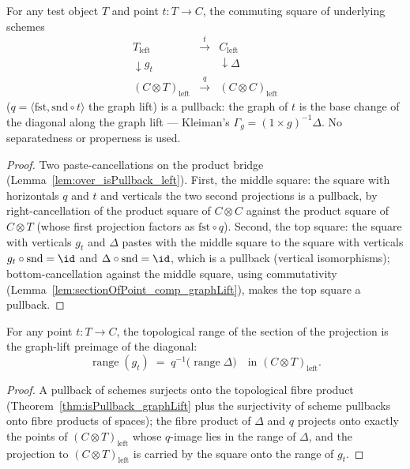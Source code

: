 \begin{theorem}
  \label{thm:isPullback_graphLift}
  \leanok
  For any test object \(T\) and point \(t \colon T \to C\), the commuting square of
  underlying schemes
  \[
    \begin{array}{ccc}
      T_{\mathrm{left}} & \xrightarrow{\ t\ } & C_{\mathrm{left}} \\
      \downarrow g_t & & \downarrow \Delta \\
      (C \otimes T)_{\mathrm{left}} & \xrightarrow{\ q\ } & (C \otimes C)_{\mathrm{left}}
    \end{array}
  \]
  (\(q = \langle\mathrm{fst}, \mathrm{snd} \circ t\rangle\) the graph lift) is a pullback:
  the graph of \(t\) is the base change of the diagonal along the graph lift — Kleiman's
  \(\Gamma_g = (1 \times g)^{-1}\Delta\). No separatedness or properness is used.
\end{theorem}
\begin{proof}
  \leanok
  Two paste-cancellations on the product bridge (Lemma~\ref{lem:over_isPullback_left}).
  First, the middle square: the square with horizontals \(q\) and \(t\) and verticals the
  two second projections is a pullback, by right-cancellation of the product square of
  \(C \otimes C\) against the product square of \(C \otimes T\) (whose first projection
  factors as \(\mathrm{fst} \circ q\)). Second, the top square: the square with verticals
  \(g_t\) and \(\Delta\) pastes with the middle square to the square with verticals
  \(g_t \circ \mathrm{snd} = \id\) and \(\Delta \circ \mathrm{snd} = \id\), which is a
  pullback (vertical isomorphisms); bottom-cancellation against the middle square, using
  commutativity (Lemma~\ref{lem:sectionOfPoint_comp_graphLift}), makes the top square a
  pullback.
\end{proof}

\begin{theorem}
  \label{thm:range_sectionOfPoint_left}
  \leanok
  For any point \(t \colon T \to C\), the topological range of the section of the
  projection is the graph-lift preimage of the diagonal:
  \[
    \operatorname{range}(g_t) \;=\; q^{-1}\bigl(\operatorname{range}\Delta\bigr)
    \quad\text{in } (C \otimes T)_{\mathrm{left}} .
  \]
\end{theorem}
\begin{proof}
  \leanok
  A pullback of schemes surjects onto the topological fibre product
  (Theorem~\ref{thm:isPullback_graphLift} plus the surjectivity of scheme pullbacks onto
  fibre products of spaces); the fibre product of \(\Delta\) and \(q\) projects onto
  exactly the points of \((C \otimes T)_{\mathrm{left}}\) whose \(q\)-image lies in the
  range of \(\Delta\), and the projection to \((C \otimes T)_{\mathrm{left}}\) is carried
  by the square onto the range of \(g_t\).
\end{proof}

